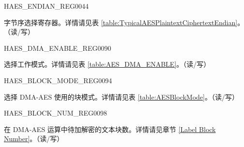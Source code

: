\begin{register}{H}{AES\_ENDIAN\_REG}{\hexprefix{}0044}\label{regdesc:AESENDIANREG}
%
%
\regnewline%
\begin{regdesc}\begin{reglist}
\item [AES\_ENDIAN] 字节序选择寄存器。详情请见表 \ref{table:TypicalAESPlaintextCiphertextEndian}。（读/写）
\end{reglist}\end{regdesc}
\end{register}


\begin{register}{H}{AES\_DMA\_ENABLE\_REG}{\hexprefix{}0090}\label{regdesc:AESDMAENABLEREG}
%
%
\regnewline%
\begin{regdesc}\begin{reglist}
\item [AES\_DMA\_ENABLE] 选择工作模式。详情请见表 \ref{table:AES_DMA_ENABLE}。（读/写）
\end{reglist}\end{regdesc}
\end{register}


\begin{register}{H}{AES\_BLOCK\_MODE\_REG}{\hexprefix{}0094}\label{regdesc:AESBLOCKMODEREG}
%
%
\regnewline%
\begin{regdesc}\begin{reglist}
\item [AES\_BLOCK\_MODE] 选择 DMA-AES 使用的块模式。详情请见表 \ref{table:AESBlockMode}。（读/写）
\end{reglist}\end{regdesc}
\end{register}


\begin{register}{H}{AES\_BLOCK\_NUM\_REG}{\hexprefix{}0098}\label{regdesc:AESBLOCKNUMREG}
%
\regnewline%
\begin{regdesc}\begin{reglist}
\item [AES\_BLOCK\_NUM] 在 DMA-AES 运算中待加解密的文本块数。详情请见章节 \ref{Label Block Number}。（读/写）
\end{reglist}\end{regdesc}
\end{register}


